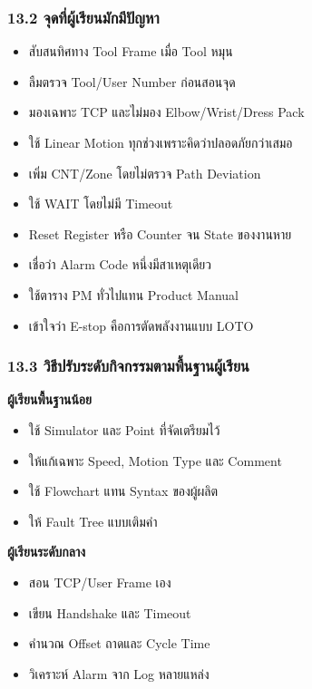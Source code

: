 \subsubsection{13.2 จุดที่ผู้เรียนมักมีปัญหา}

\begin{itemize}
    \item สับสนทิศทาง Tool Frame เมื่อ Tool หมุน
    \item ลืมตรวจ Tool/User Number ก่อนสอนจุด
    \item มองเฉพาะ TCP และไม่มอง Elbow/Wrist/Dress Pack
    \item ใช้ Linear Motion ทุกช่วงเพราะคิดว่าปลอดภัยกว่าเสมอ
    \item เพิ่ม CNT/Zone โดยไม่ตรวจ Path Deviation
    \item ใช้ WAIT โดยไม่มี Timeout
    \item Reset Register หรือ Counter จน State ของงานหาย
    \item เชื่อว่า Alarm Code หนึ่งมีสาเหตุเดียว
    \item ใช้ตาราง PM ทั่วไปแทน Product Manual
    \item เข้าใจว่า E-stop คือการตัดพลังงานแบบ LOTO
\end{itemize}

\subsubsection{13.3 วิธีปรับระดับกิจกรรมตามพื้นฐานผู้เรียน}

\textbf{ผู้เรียนพื้นฐานน้อย}

\begin{itemize}
    \item ใช้ Simulator และ Point ที่จัดเตรียมไว้
    \item ให้แก้เฉพาะ Speed, Motion Type และ Comment
    \item ใช้ Flowchart แทน Syntax ของผู้ผลิต
    \item ให้ Fault Tree แบบเติมคำ
\end{itemize}

\textbf{ผู้เรียนระดับกลาง}

\begin{itemize}
    \item สอน TCP/User Frame เอง
    \item เขียน Handshake และ Timeout
    \item คำนวณ Offset ถาดและ Cycle Time
    \item วิเคราะห์ Alarm จาก Log หลายแหล่ง
\end{itemize}

